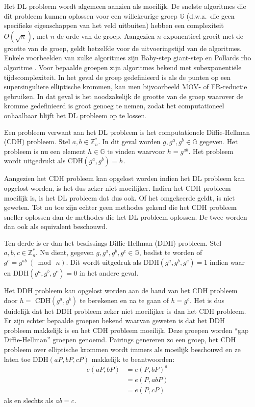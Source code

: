 Het DL probleem wordt algemeen aanzien als moeilijk. De snelste algoritmes die dit probleem kunnen oplossen voor een willekeurige groep $\mathbb{G}$ (d.w.z.\ die geen specifieke eigenschappen van het veld uitbuiten) hebben een complexiteit $O(\sqrt{n})$, met $n$ de orde van de groep. Aangezien $n$ exponentieel groeit met de grootte van de groep, geldt hetzelfde voor de uitvoeringstijd van de algoritmes. Enkele voorbeelden van zulke algoritmes zijn Baby-step giant-step \cite{baby-step} en Pollards rho algoritme \cite{pollard-rho}. Voor bepaalde groepen zijn algoritmes bekend met subexponenti\"ele tijdscomplexiteit. In het geval de groep gedefinieerd is als de punten op een supersinguliere elliptische krommen, kan men bijvoorbeeld MOV- \cite{mov} of FR-reductie \cite{ruck} gebruiken. In dat geval is het noodzakelijk de grootte van de groep waarover de kromme gedefinieerd is groot genoeg te nemen, zodat het computationeel onhaalbaar blijft het DL probleem op te lossen.

Een probleem verwant aan het DL probleem is het computationele Diffie-Hellman (CDH) probleem. Stel $a, b \in \mathbb{Z}^*_n$. In dit geval worden $g, g^a, g^b \in \mathbb{G}$ gegeven. Het probleem is nu een element $h \in \mathbb{G}$ te vinden waarvoor $h = g^{ab}$. Het probleem wordt uitgedrukt als CDH$(g^a, g^b) = h$.

Aangezien het CDH probleem kan opgelost worden indien het DL probleem kan opgelost worden, is het dus zeker niet moeilijker. Indien het CDH probleem moeilijk is, is het DL probleem dat dus ook. Of het omgekeerde geldt, is niet geweten. Tot nu toe zijn echter geen methodes gekend die het CDH probleem sneller oplossen dan de methodes die het DL probleem oplossen. De twee worden dan ook als equivalent beschouwd.

Ten derde is er dan het beslissings Diffie-Hellman (DDH) probleem. Stel $a, b, c \in \mathbb{Z}^*_n$. Nu dient, gegeven $g, g^a, g^b, g^c \in \mathbb{G}$, beslist te worden of $g^c = g^{ab} \: (\bmod \: n)$. Dit wordt uitgedruk als DDH$(g^a, g^b, g^c) = 1$ indien waar en DDH$(g^a, g^b, g^c) = 0$ in het andere geval.

Het DDH probleem kan opgelost worden aan de hand van het CDH probleem door $h =$ CDH$(g^a, g^b)$ te berekenen en na te gaan of $h = g^c$. Het is dus duidelijk dat het DDH probleem zeker niet moeilijker is dan het CDH probleem. Er zijn echter bepaalde groepen bekend waarvan geweten is dat het DDH probleem makkelijk is en het CDH probleem moeilijk. Deze groepen worden ``gap Diffie-Hellman'' groepen genoemd. Pairings genereren zo een groep, het CDH probleem over elliptische krommen wordt immers als moeilijk beschouwd en ze laten toe DDH$(aP, bP, cP)$ makkelijk te beantwoorden:
\[\begin{aligned}
e(aP, bP) &= e(P, bP)^a\\
								&= e(P, abP)\\
								&= e(P, cP)
\end{aligned}\]
als en slechts als $ab = c$.


